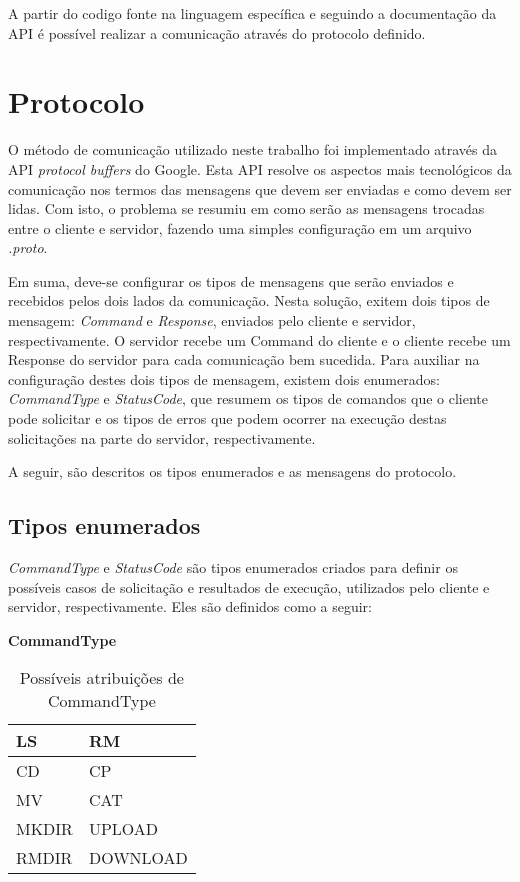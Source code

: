 \documentclass[
	11pt,				%
	oneside,			%
	a4paper,			%
	english,			%
	brazil,				%
	]{article}
\begin{document}
A partir do codigo fonte na linguagem específica e seguindo a documentação da API é possível realizar a comunicação através do protocolo definido.

\section{Protocolo}
O método de comunicação utilizado neste trabalho foi implementado através da API \textit{protocol buffers} do Google. Esta API resolve os aspectos mais tecnológicos da comunicação nos termos das mensagens que devem ser enviadas e como devem ser lidas. Com isto, o problema se resumiu em como serão as mensagens trocadas entre o cliente e servidor, fazendo uma simples configuração em um arquivo \textit{.proto}.

Em suma, deve-se configurar os tipos de mensagens que serão enviados e recebidos pelos dois lados da comunicação. Nesta solução, exitem dois tipos de mensagem: \textit{Command} e \textit{Response}, enviados pelo cliente e servidor, respectivamente. O servidor recebe um Command do cliente e o cliente recebe um Response do servidor para cada comunicação bem sucedida. Para auxiliar na configuração destes dois tipos de mensagem, existem dois enumerados: \textit{CommandType} e \textit{StatusCode}, que resumem os tipos de comandos que o cliente pode solicitar e os tipos de erros que podem ocorrer na execução destas solicitações na parte do servidor, respectivamente.

A seguir, são descritos os tipos enumerados e as mensagens do protocolo.

\subsection{Tipos enumerados}
\textit{CommandType} e \textit{StatusCode} são tipos enumerados criados para definir os possíveis casos de solicitação e resultados de execução, utilizados pelo cliente e servidor, respectivamente. Eles são definidos como a seguir:

\begin{center}
\textbf{CommandType}
\end{center}

\begin{table}[H]
\centering
\begin{tabular}{|l|l|}
\hline
LS & RM \\
\hline
CD & CP \\
\hline
MV & CAT \\
\hline
MKDIR & UPLOAD \\
\hline
RMDIR & DOWNLOAD \\
\hline
\end{tabular}
\caption{Possíveis atribuições de CommandType}
\label{tab:matrizes}
\end{table}
\end{document}
